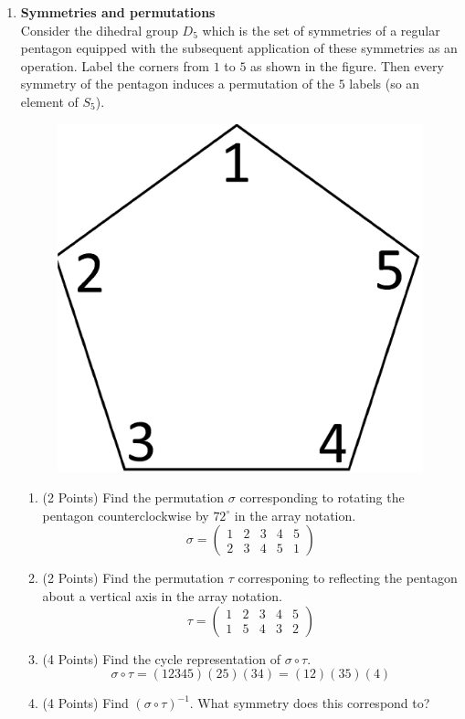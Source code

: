 \documentclass[12pt]{article}
\begin{document}
\begin{enumerate}
\newpage
\item \textbf{Symmetries and permutations}\\ Consider the dihedral group $D_5$ which is the set of symmetries of a regular pentagon equipped with the subsequent application of these symmetries as an operation. Label the corners from $1$ to $5$ as shown in the figure. Then every symmetry of the pentagon induces a permutation of the $5$ labels (so an element of $S_5$).
\begin{figure}[ht]
\centering
\includegraphics[scale=0.05]{Pentagon.jpg}
\end{figure}
\begin{enumerate}
\item (2 Points) Find the permutation $\sigma$ corresponding to rotating the pentagon counterclockwise by $72^\circ$ in the array notation.
\[
\sigma=\left(\begin{array}{ccccc}
1&2&3&4&5\\
2&3&4&5&1
\end{array}\right)
\]
\item (2 Points) Find the permutation $\tau$ corresponing to reflecting the pentagon about a vertical axis in the array notation.
\[
\tau=\left(\begin{array}{ccccc}
1&2&3&4&5\\
1&5&4&3&2
\end{array}\right)
\]
\item (4 Points) Find the cycle representation of $\sigma\circ\tau$. 
\[
\sigma\circ\tau=(1 2 3 4 5)(2 5)(3 4)=(1 2)(3 5) (4)
\]
\item (4 Points) Find $(\sigma\circ\tau)^{-1}$. What symmetry does this correspond to? 


\end{enumerate}
\end{enumerate}
\end{document}
